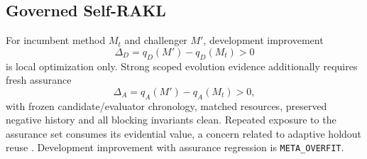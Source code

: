\subsection{Governed Self-RAKL}
For incumbent method $M_t$ and challenger $M'$, development improvement
\begin{equation}\Delta_D=q_D(M')-q_D(M_t)>0\end{equation}
is local optimization only. Strong scoped evolution evidence additionally requires fresh assurance
\begin{equation}\Delta_A=q_A(M')-q_A(M_t)>0,\end{equation}
with frozen candidate/evaluator chronology, matched resources, preserved negative history and all blocking invariants clean. Repeated exposure to the assurance set consumes its evidential value, a concern related to adaptive holdout reuse \cite{dwork2015}. Development improvement with assurance regression is \texttt{META\_OVERFIT}.

